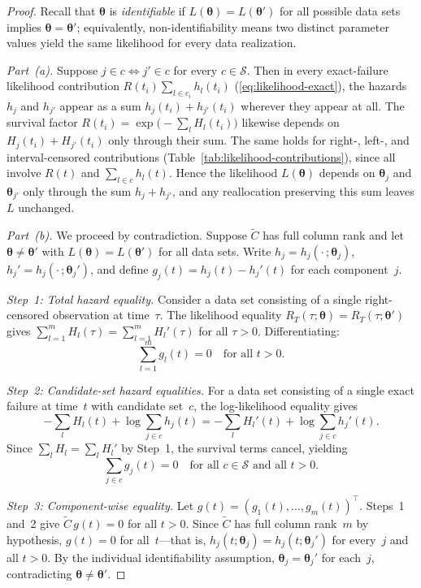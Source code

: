 \documentclass[11pt]{article}
\theoremstyle{definition}
\theoremstyle{plain}
\renewcommand{\v}[1]{\boldsymbol{#1}}
\begin{document}
\begin{proof}
Recall that $\v{\theta}$ is \emph{identifiable} if
$L(\v{\theta}) = L(\v{\theta}')$ for all possible data sets
implies $\v{\theta} = \v{\theta}'$; equivalently, non-identifiability
means two distinct parameter values yield the same likelihood for every
data realization.

\emph{Part~(a).}
Suppose $j \in c \iff j' \in c$ for every $c \in \mathcal{S}$.
Then in every exact-failure likelihood contribution
$R(t_i) \sum_{l \in c_i} h_l(t_i)$
(\eqref{eq:likelihood-exact}),
the hazards $h_j$ and $h_{j'}$ appear as a sum
$h_j(t_i) + h_{j'}(t_i)$ wherever they appear at all.
The survival factor
$R(t_i) = \exp\bigl(-\sum_l H_l(t_i)\bigr)$ likewise depends on
$H_j(t_i) + H_{j'}(t_i)$ only through their sum.
The same holds for right-, left-, and interval-censored
contributions (Table~\ref{tab:likelihood-contributions}),
since all involve $R(t)$ and $\sum_{l \in c} h_l(t)$.
Hence the likelihood $L(\v{\theta})$ depends on $\v{\theta}_j$ and
$\v{\theta}_{j'}$ only through the sum $h_j + h_{j'}$, and any
reallocation preserving this sum leaves $L$ unchanged.

\emph{Part~(b).}
We proceed by contradiction.
Suppose $\tilde{C}$ has full column rank and let
$\v{\theta} \neq \v{\theta}'$ with $L(\v{\theta}) = L(\v{\theta}')$
for all data sets.
Write $h_j = h_j(\cdot\,; \v{\theta}_j)$,
$h_j' = h_j(\cdot\,; \v{\theta}_j')$, and define
$g_j(t) = h_j(t) - h_j'(t)$ for each component~$j$.

\emph{Step~1: Total hazard equality.}
Consider a data set consisting of a single right-censored observation
at time~$\tau$.
The likelihood equality
$R_{T}(\tau; \v{\theta}) = R_{T}(\tau; \v{\theta}')$ gives
$\sum_{l=1}^m H_l(\tau) = \sum_{l=1}^m H_l'(\tau)$ for all
$\tau > 0$.
Differentiating:
\begin{equation}
\label{eq:total-hazard-eq}
    \sum_{l=1}^m g_l(t) = 0
    \quad \text{for all } t > 0.
\end{equation}

\emph{Step~2: Candidate-set hazard equalities.}
For a data set consisting of a single exact failure at time~$t$ with
candidate set~$c$, the log-likelihood equality gives
\begin{equation}
\label{eq:ident-proof}
    -\sum_l H_l(t) + \log \sum_{j \in c} h_j(t)
    = -\sum_l H_l'(t) + \log \sum_{j \in c} h_j'(t).
\end{equation}
Since $\sum_l H_l = \sum_l H_l'$ by Step~1, the survival terms
cancel, yielding
\begin{equation}
\label{eq:candidate-eq}
    \sum_{j \in c} g_j(t) = 0
    \quad \text{for all } c \in \mathcal{S} \text{ and all } t > 0.
\end{equation}

\emph{Step~3: Component-wise equality.}
Let $g(t) = (g_1(t), \ldots, g_m(t))^\top$.
Steps~1 and~2 give $\tilde{C} \, g(t) = 0$ for all $t > 0$.
Since $\tilde{C}$ has full column rank~$m$ by hypothesis,
$g(t) = 0$ for all~$t$---that is,
$h_j(t; \v{\theta}_j) = h_j(t; \v{\theta}_j')$ for every~$j$ and
all $t > 0$.
By the individual identifiability assumption,
$\v{\theta}_j = \v{\theta}_j'$ for each~$j$, contradicting
$\v{\theta} \neq \v{\theta}'$.
\end{proof}
\end{document}
